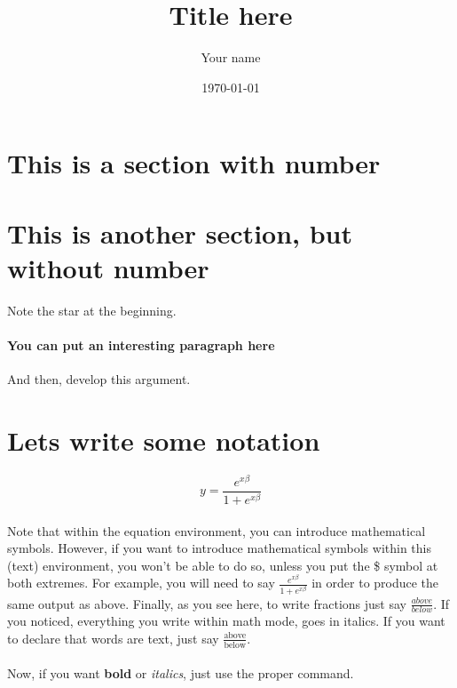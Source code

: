 \documentclass[11pt, oneside]{article}   	%
\title{Title here}
\author{Your name}
\date{\today}
\begin{document}
\maketitle



\section{This is a section with number}

\section*{This is another section, but without number} Note the star at the beginning.


\paragraph{You can put an interesting paragraph here}And then, develop this argument.

\section{Lets write some notation}


\begin{equation}
y= \frac{e^{x\beta}}{1 + e^{x\beta }}\label{equation:1}
\end{equation}

\paragraph{}Note that within the equation environment, you can introduce mathematical symbols. However, if you want to introduce mathematical symbols within this (text) environment, you won't be able to do so, unless you put the \$ symbol at both extremes. For example, you will need to say $\frac{e^{x\beta }}{1+e^{x\beta}}$ in order to produce the same output as above. Finally, as you see here, to write fractions just say $\frac{above}{below}$. If you noticed, everything you write within math mode, goes in italics. If you want to declare that words are text, just say $\frac{\text{above}}{\text{below}}$.

\paragraph{}Now, if you want {\bf bold} or \emph{italics}, just use the proper command. 
\end{document}
